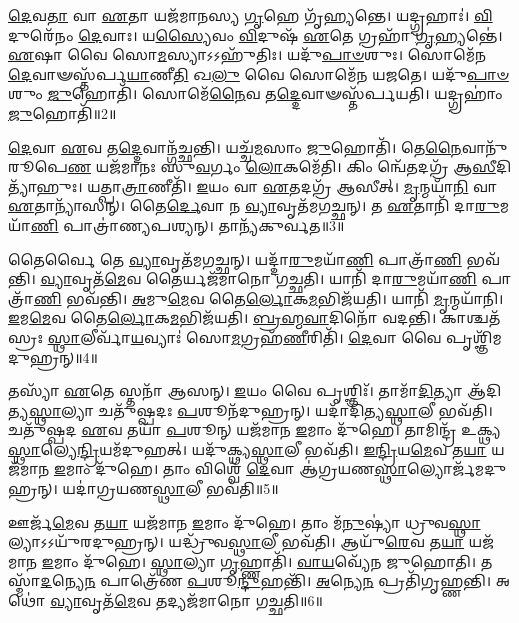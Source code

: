\-\ul{𑌦𑍇}\-𑌵\-\ul{𑌤𑌾} 𑌵𑌾 \ul{𑌏}\-𑌤𑌾 𑌯𑌜᳴𑌮𑌾𑌨𑌸𑍍𑌯 \ul{𑌗𑍃}\-𑌹𑍇 𑌗𑍃᳴𑌹𑍍𑌯𑌨𑍍𑌤𑍇।
𑌯𑌦𑍍𑌗𑍍𑌰𑌹𑌾𑌃॑।
\-\ul{𑌵𑌿}\-𑌦𑍁𑌰𑍇᳴𑌨𑌂 \ul{𑌦𑍇}\-𑌵𑌾𑌃।
𑌯\-\ul{𑌸𑍍𑌯𑍈}\-𑌵𑌂 \ul{𑌵𑌿}\-𑌦𑍁𑌷᳴ \ul{𑌏}\-𑌤𑍇 𑌗𑍍𑌰𑌹𑌾᳴ \ul{𑌗𑍃}\-𑌹𑍍𑌯𑌨𑍍𑌤𑍇॑।
\-\ul{𑌏}\-𑌷𑌾 𑌵𑍈 𑌸𑍋\-\ul{𑌮}\-𑌸𑍍𑌯𑌾\-𑌽𑌽𑌹𑍁᳴𑌤𑌿𑌃।
𑌯𑌦𑍁᳴\-\ul{𑌪𑌾}\-\-\ul{𑍞}\-𑌶𑍁𑌃।
𑌸𑍋𑌮𑍇᳴𑌨 \ul{𑌦𑍇}\-𑌵𑌾𑍟𑌸𑍍𑌤᳴𑌰𑍍𑌪\-\ul{𑌯𑌾}\-𑌣𑍀\-\ul{𑌤𑌿} 𑌖\-\ul{𑌲𑍁} 𑌵𑍈 𑌸𑍋𑌮𑍇᳴𑌨 𑌯𑌜𑌤𑍇।
𑌯𑌦𑍁᳴\-\ul{𑌪𑌾}\-\-\ul{𑍞}\-𑌶𑍁𑌂 \ul{𑌜𑍁}\-𑌹𑍋𑌤𑌿᳴।
𑌸𑍋𑌮𑍇᳴\-\ul{𑌨𑍈}\-𑌵 𑌤\-\ul{𑌦𑍍𑌦𑍇}\-𑌵𑌾𑍟𑌸𑍍𑌤᳴𑌰𑍍𑌪𑌯𑌤𑌿।
𑌯𑌦𑍍𑌗𑍍𑌰𑌹𑌾𑌂॑ \ul{𑌜𑍁}\-𑌹𑍋𑌤𑌿᳴॥2॥

\-\ul{𑌦𑍇}\-𑌵𑌾 \ul{𑌏}\-𑌵 𑌤\-\ul{𑌦𑍍𑌦𑍇}\-𑌵𑌾𑌨𑍍𑌗᳴𑌚𑍍𑌛𑌨𑍍𑌤𑌿।
𑌯𑌚𑍍𑌚᳴\-\ul{𑌮}\-𑌸𑌾𑌂 \ul{𑌜𑍁}\-𑌹𑍋𑌤𑌿᳴।
𑌤𑍇\-\ul{𑌨𑍈}\-𑌵𑌾𑌨𑍁᳴𑌰𑍂𑌪𑍇\-\ul{𑌣} 𑌯𑌜᳴𑌮𑌾𑌨𑌃 𑌸𑍁\-\ul{𑌵}\-𑌰𑍍𑌗𑌂 \ul{𑌲𑍋}\-𑌕𑌮𑍇᳴𑌤𑌿।
𑌕𑌿𑌂 𑌨𑍍𑌵𑍇᳴𑌤𑌦𑌗𑍍𑌰᳴ 𑌆\-\ul{𑌸𑍀}\-𑌦𑌿𑌤𑍍𑌯𑌾᳴𑌹𑍁𑌃।
𑌯𑌤𑍍𑌪𑌾\-\ul{𑌤𑍍𑌰𑌾}\-𑌣𑍀𑌤𑌿᳴।
\-\ul{𑌇}\-𑌯𑌂 𑌵𑌾 \ul{𑌏}\-𑌤𑌦𑌗𑍍𑌰᳴ 𑌆𑌸𑍀𑌤𑍍।
\-\ul{𑌮𑍃}\-𑌨𑍍𑌮𑌯𑌾᳴\-\ul{𑌨𑌿} 𑌵𑌾 \ul{𑌏}\-𑌤𑌾𑌨𑍍𑌯𑌾᳴𑌸𑌨𑍍।
𑌤𑍈\-\ul{𑌰𑍍𑌦𑍇}\-𑌵𑌾 𑌨 \ul{𑌵𑍍𑌯𑌾}\-𑌵𑍃𑌤᳴𑌮𑌗𑌚𑍍𑌛𑌨𑍍।
𑌤 \ul{𑌏}\-𑌤𑌾𑌨𑌿᳴ 𑌦𑌾\-\ul{𑌰𑍁}\-𑌮𑌯𑌾᳴\-\ul{𑌣𑌿} 𑌪𑌾𑌤𑍍𑌰𑌾॑𑌣𑍍𑌯𑌪𑌶𑍍𑌯𑌨𑍍।
𑌤𑌾𑌨𑍍𑌯᳴𑌕𑍁𑌰𑍍𑌵𑌤॥3॥

𑌤𑍈𑌰𑍍𑌵𑍈 𑌤𑍇 \ul{𑌵𑍍𑌯𑌾}\-𑌵𑍃𑌤᳴𑌮𑌗𑌚𑍍𑌛𑌨𑍍।
𑌯𑌦𑍍𑌦𑌾᳴\-\ul{𑌰𑍁}\-𑌮𑌯𑌾᳴\-\ul{𑌣𑌿} 𑌪𑌾𑌤𑍍𑌰𑌾᳴\-\ul{𑌣𑌿} 𑌭𑌵᳴𑌨𑍍𑌤𑌿।
\-\ul{𑌵𑍍𑌯𑌾}\-𑌵𑍃𑌤᳴\-\ul{𑌮𑍇}\-𑌵 𑌤𑍈𑌰𑍍𑌯𑌜᳴𑌮𑌾𑌨𑍋 𑌗𑌚𑍍𑌛𑌤𑌿।
𑌯𑌾𑌨𑌿᳴ 𑌦𑌾\-\ul{𑌰𑍁}\-𑌮𑌯𑌾᳴\-\ul{𑌣𑌿} 𑌪𑌾𑌤𑍍𑌰𑌾᳴\-\ul{𑌣𑌿} 𑌭𑌵᳴𑌨𑍍𑌤𑌿।
\-\ul{𑌅}\-𑌮𑍁\-\ul{𑌮𑍇}\-𑌵 𑌤𑍈\-\ul{𑌰𑍍𑌲𑍋}\-𑌕\-\ul{𑌮}\-𑌭𑌿𑌜᳴𑌯𑌤𑌿।
𑌯𑌾𑌨𑌿᳴ \ul{𑌮𑍃}\-𑌨𑍍𑌮𑌯𑌾᳴𑌨𑌿।
\-\ul{𑌇}\-𑌮\-\ul{𑌮𑍇}\-𑌵 𑌤𑍈\-\ul{𑌰𑍍𑌲𑍋}\-𑌕\-\ul{𑌮}\-𑌭𑌿𑌜᳴𑌯𑌤𑌿।
\-\ul{𑌬𑍍𑌰}\-\-\ul{𑌹𑍍𑌮}\-\-\ul{𑌵𑌾}\-𑌦𑌿𑌨𑍋᳴ 𑌵𑌦𑌨𑍍𑌤𑌿।
𑌕𑌾𑌶𑍍𑌚𑌤᳴𑌸𑍍𑌰𑌃 \ul{𑌸𑍍𑌥𑌾}\-𑌲𑍀𑌰𑍍𑌵𑌾᳴\-\ul{𑌯}\-𑌵𑍍𑌯𑌾𑌃॑ 𑌸𑍋\-\ul{𑌮}\-𑌗𑍍𑌰𑌹᳴\-\ul{𑌣𑍀}\-𑌰𑌿𑌤𑌿᳴।
\-\ul{𑌦𑍇}\-𑌵𑌾 𑌵𑍈 𑌪𑍃𑌶𑍍𑌞𑌿᳴𑌮𑌦𑍁𑌹𑍍𑌰𑌨𑍍॥4॥

𑌤𑌸𑍍𑌯𑌾᳴ \ul{𑌏}\-𑌤𑍇 𑌸𑍍𑌤𑌨𑌾᳴ 𑌆𑌸𑌨𑍍।
\-\ul{𑌇}\-𑌯𑌂 𑌵𑍈 𑌪𑍃𑌶𑍍𑌞𑌿𑌃᳴।
𑌤𑌾𑌮𑌾᳴\-\ul{𑌦𑌿}\-𑌤𑍍𑌯𑌾 𑌆᳴𑌦𑌿𑌤𑍍𑌯\-\ul{𑌸𑍍𑌥𑌾}\-𑌲𑍍𑌯𑌾 𑌚𑌤𑍁᳴𑌷𑍍𑌪𑌦𑌃 \ul{𑌪}\-𑌶𑍂𑌨᳴𑌦𑍁𑌹𑍍𑌰𑌨𑍍।
𑌯𑌦𑌾᳴𑌦𑌿𑌤𑍍𑌯\-\ul{𑌸𑍍𑌥𑌾}\-𑌲𑍀 𑌭𑌵᳴𑌤𑌿।
𑌚𑌤𑍁᳴𑌷𑍍𑌪𑌦 \ul{𑌏}\-𑌵 𑌤𑌯𑌾᳴ \ul{𑌪}\-𑌶𑍂𑌨𑍍 𑌯𑌜᳴𑌮𑌾𑌨 \ul{𑌇}\-𑌮𑌾𑌂 𑌦𑍁᳴𑌹𑍇।
𑌤𑌾𑌮𑌿𑌨𑍍𑌦𑍍𑌰᳴ 𑌉𑌕𑍍𑌥𑍍𑌯\-\ul{𑌸𑍍𑌥𑌾}\-𑌲𑍍𑌯𑍇\-\ul{𑌨𑍍𑌦𑍍𑌰𑌿}\-𑌯𑌮᳴𑌦𑍁𑌹𑌤𑍍।
𑌯𑌦𑍁᳴𑌕𑍍𑌥𑍍𑌯\-\ul{𑌸𑍍𑌥𑌾}\-𑌲𑍀 𑌭𑌵᳴𑌤𑌿।
\-\ul{𑌇}\-\-\ul{𑌨𑍍𑌦𑍍𑌰𑌿}\-𑌯\-\ul{𑌮𑍇}\-𑌵 𑌤\-\ul{𑌯𑌾} 𑌯𑌜᳴𑌮𑌾𑌨 \ul{𑌇}\-𑌮𑌾𑌂 𑌦𑍁᳴𑌹𑍇।
𑌤𑌾𑌂 𑌵𑌿𑌶𑍍𑌵𑍇᳴ \ul{𑌦𑍇}\-𑌵𑌾 𑌆॑𑌗𑍍𑌰𑌯𑌣\-\ul{𑌸𑍍𑌥𑌾}\-𑌲𑍍𑌯𑍋𑌰𑍍𑌜᳴𑌮𑌦𑍁𑌹𑍍𑌰𑌨𑍍।
𑌯𑌦𑌾॑𑌗𑍍𑌰𑌯𑌣\-\ul{𑌸𑍍𑌥𑌾}\-𑌲𑍀 𑌭𑌵᳴𑌤𑌿॥5॥

𑌊𑌰𑍍𑌜᳴\-\ul{𑌮𑍇}\-𑌵 𑌤\-\ul{𑌯𑌾} 𑌯𑌜᳴𑌮𑌾𑌨 \ul{𑌇}\-𑌮𑌾𑌂 𑌦𑍁᳴𑌹𑍇।
𑌤𑌾𑌂 𑌮᳴\-\ul{𑌨𑍁}\-𑌷𑍍𑌯𑌾॑ 𑌧𑍍𑌰𑍁𑌵\-\ul{𑌸𑍍𑌥𑌾}\-𑌲𑍍𑌯𑌾\-𑌽𑌽𑌯𑍁᳴𑌰𑌦𑍁𑌹𑍍𑌰𑌨𑍍।
𑌯𑌦𑍍𑌧𑍍𑌰𑍁᳴𑌵\-\ul{𑌸𑍍𑌥𑌾}\-𑌲𑍀 𑌭𑌵᳴𑌤𑌿।
𑌆𑌯𑍁᳴\-\ul{𑌰𑍇}\-𑌵 𑌤\-\ul{𑌯𑌾} 𑌯𑌜᳴𑌮𑌾𑌨 \ul{𑌇}\-𑌮𑌾𑌂 𑌦𑍁᳴𑌹𑍇।
\-\ul{𑌸𑍍𑌥𑌾}\-𑌲𑍍𑌯𑌾 \ul{𑌗𑍃}\-𑌹𑍍𑌣𑌾𑌤𑌿᳴।
\-\ul{𑌵𑌾}\-\-\ul{𑌯}\-𑌵𑍍𑌯𑍇᳴𑌨 𑌜𑍁𑌹𑍋𑌤𑌿।
𑌤𑌸𑍍𑌮𑌾᳴\-\ul{𑌦}\-𑌨𑍍𑌯𑍇\-\ul{𑌨} 𑌪𑌾𑌤𑍍𑌰𑍇᳴𑌣 \ul{𑌪}\-𑌶𑍂\-\ul{𑌨𑍍𑌦𑍁}\-𑌹𑌨𑍍𑌤𑌿᳴।
\-\ul{𑌅}\-𑌨𑍍𑌯𑍇\-\ul{𑌨} 𑌪𑍍𑌰𑌤𑌿᳴\-𑌗𑍃𑌹𑍍𑌣𑌨𑍍𑌤𑌿।
𑌅𑌥𑍋॑ \ul{𑌵𑍍𑌯𑌾}\-𑌵𑍃𑌤᳴\-\ul{𑌮𑍇}\-𑌵 𑌤𑌦𑍍𑌯𑌜᳴𑌮𑌾𑌨𑍋 𑌗𑌚𑍍𑌛𑌤𑌿॥6॥\anuvakamend[\-\ul{𑌗𑍍𑌰}\-\-\ul{𑌹}\-𑌤𑍍𑌵𑌂 𑌗𑍍𑌰𑌹𑌾𑌂॑ \ul{𑌜𑍁}\-𑌹𑍋𑌤𑍍𑌯᳴𑌕𑍁𑌰𑍍𑌵𑌤𑌾𑌦𑍁𑌹𑍍𑌰𑌨𑍍𑌨𑌾𑌗𑍍𑌰𑌯𑌣\-\ul{𑌸𑍍𑌥𑌾}\-𑌲𑍀 𑌭𑌵᳴\-\ul{𑌤𑌿} 𑌨𑌵᳴ 𑌚]

